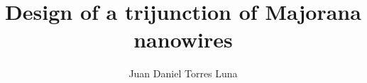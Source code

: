 \documentclass[whitelogo]{tudelft-report}
\begin{document}


\title[tudelft-black]{Design of a trijunction of Majorana nanowires}
\author[tudelft-black]{Juan Daniel Torres Luna}

\makecover[split]




%

\tableofcontents

\mainmatter









\end{document}

